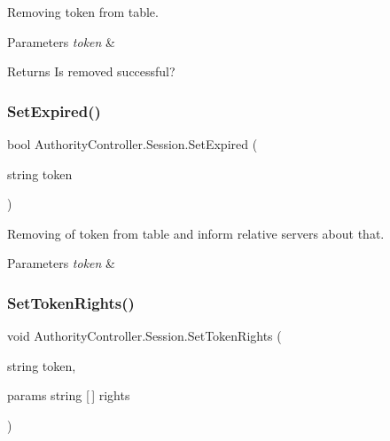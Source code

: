 Removing token from table. 


\begin{DoxyParams}{Parameters}
{\em token} & \\
\hline
\end{DoxyParams}
\begin{DoxyReturn}{Returns}
Is removed successful?
\end{DoxyReturn}
\mbox{\label{class_authority_controller_1_1_session_a811b23b70e61ac567ec8eeb54641ffcd}} 
\subsubsection{\texorpdfstring{Set\+Expired()}{SetExpired()}}
{\footnotesize\ttfamily bool Authority\+Controller.\+Session.\+Set\+Expired (\begin{DoxyParamCaption}\item[{string}]{token }\end{DoxyParamCaption})}



Removing of token from table and inform relative servers about that. 


\begin{DoxyParams}{Parameters}
{\em token} & \\
\hline
\end{DoxyParams}
\mbox{\label{class_authority_controller_1_1_session_a481d888a9a2e90f1e43c60de7e1c7a71}} 
\subsubsection{\texorpdfstring{Set\+Token\+Rights()}{SetTokenRights()}}
{\footnotesize\ttfamily void Authority\+Controller.\+Session.\+Set\+Token\+Rights (\begin{DoxyParamCaption}\item[{string}]{token,  }\item[{params string \mbox{[}$\,$\mbox{]}}]{rights }\end{DoxyParamCaption})}



